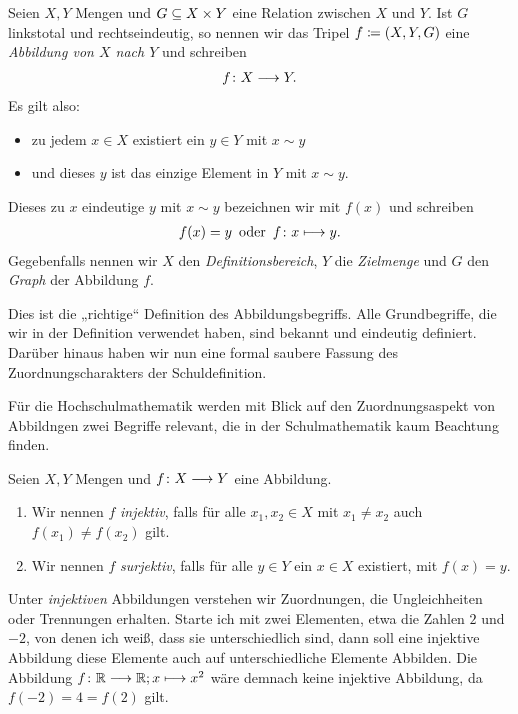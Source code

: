 \begin{defin}
  Seien $X,Y$ Mengen und $G \subseteq X\times Y$ eine Relation zwischen $X$ und
  $Y$. Ist $G$ linkstotal und rechtseindeutig, so nennen wir das Tripel
  $f\coloneqq (X,Y,G)$ eine \emph{Abbildung von $X$ nach $Y$} und schreiben
  \begin{align*}
    f \colon X \longrightarrow Y.
  \end{align*}
  Es gilt also:
  \begin{itemize}
    \item zu jedem $x\in X$ existiert ein $y \in Y$ mit $x \sim y$
    \item und dieses $y$ ist das einzige Element in $Y$ mit $x \sim y$.
  \end{itemize}
  Dieses zu $x$ eindeutige $y$ mit $x\sim y$ bezeichnen wir mit
  $f(x)$ und schreiben
  \begin{align*}
    f(x) = y \,\text{ oder }\, f\colon x \longmapsto y.
  \end{align*}
  Gegebenfalls nennen wir $X$ den \emph{Definitionsbereich}, $Y$ die
  \emph{Zielmenge} und $G$ den \emph{Graph} der Abbildung $f$.
\end{defin}


Dies ist die „richtige“ Definition des Abbildungsbegriffs. Alle Grundbegriffe,
die wir in der Definition verwendet haben, sind bekannt und eindeutig definiert.
Darüber hinaus haben wir nun eine formal saubere Fassung des
Zuordnungscharakters der Schuldefinition.

Für die Hochschulmathematik werden mit Blick auf den Zuordnungsaspekt von
Abbildngen zwei Begriffe relevant, die in der Schulmathematik kaum Beachtung
finden.


\begin{defin}
  Seien $X,Y$ Mengen und $f\colon X \longrightarrow Y$ eine Abbildung. 
  \begin{enumerate}
    \item Wir nennen $f$ \emph{injektiv}, falls für alle $x_{1}, x_{2}\in X$ mit
      $x_{1} \neq x_{2}$ auch $f(x_{1}) \neq f(x_{2})$ gilt.
    \item Wir nennen $f$ \emph{surjektiv}, falls für alle $y\in Y$ ein $x\in X$
      existiert, mit $f(x)=y$.
  \end{enumerate}
\end{defin}


Unter \emph{injektiven} Abbildungen verstehen wir Zuordnungen, die
Ungleichheiten oder Trennungen erhalten. Starte ich mit zwei Elementen, etwa die
Zahlen $2$ und $-2$, von denen ich weiß, dass sie unterschiedlich sind, dann
soll eine injektive Abbildung diese Elemente auch auf unterschiedliche Elemente
Abbilden. Die Abbildung $f\colon \mathbb R \longrightarrow \mathbb R; x \longmapsto x^{2}$ wäre demnach keine
injektive Abbildung, da $f(-2) = 4 = f(2)$ gilt.

